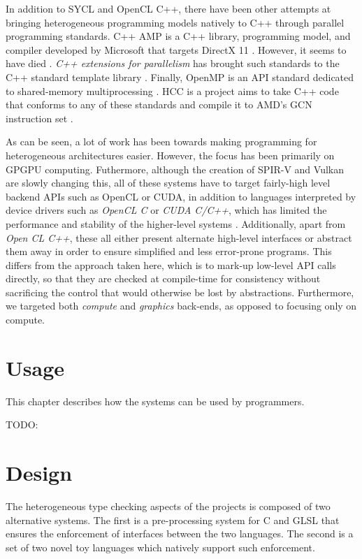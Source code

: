 \documentclass[a4paper,12pt,twoside,openright]{report}
\begin{document}
In addition to SYCL and OpenCL C++, there have been other attempts at bringing
heterogeneous programming models natively to C++ through parallel programming
standards. C++ AMP is a C++ library, programming model, and compiler developed
by Microsoft that targets DirectX 11 \cite{CAMP}. However, it seems to have
died \cite{CAMPFail1} \cite{CAMPFail2}. \textit{C++ extensions for parallelism}
has brought such standards to the C++ standard template library
\cite{CPPParallelism}. Finally, OpenMP is an API standard dedicated to
shared-memory multiprocessing \cite{OpenMP}. HCC is a project aims to take C++
code that conforms to any of these standards and compile it to AMD's GCN
instruction set \cite{HCC}.

As can be seen, a lot of work has been towards making programming for
heterogeneous architectures easier. However, the focus has been primarily on
GPGPU computing. Futhermore, although the creation of SPIR-V and Vulkan are
slowly changing this, all of these systems have to target fairly-high level
backend APIs such as OpenCL or CUDA, in addition to languages interpreted by
device drivers such as \textit{OpenCL C} or \textit{CUDA C/C++}, which has
limited the performance and stability of the higher-level systems
\cite{GLFuzz}. Additionally, apart from \textit{Open CL C++}, these all either
present alternate high-level interfaces or abstract them away in order to
ensure simplified and less error-prone programs. This differs from the approach
taken here, which is to mark-up low-level API calls directly, so that they are
checked at compile-time for consistency without sacrificing the control that
would otherwise be lost by abstractions. Furthermore, we targeted both
\textit{compute} and \textit{graphics} back-ends, as opposed to focusing only on
compute.


\chapter{Usage}

This chapter describes how the systems can be used by programmers.

TODO:

\chapter{Design}

The heterogeneous type checking aspects of the projects is composed of two
alternative systems. The first is a pre-processing system for C and GLSL that
ensures the enforcement of interfaces between the two languages. The second is
a set of two novel toy languages which natively support such enforcement.
\end{document}
